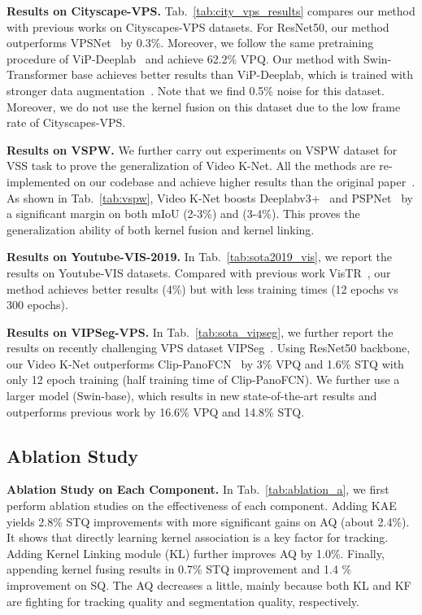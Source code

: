 \noindent
\textbf{Results on Cityscape-VPS.} Tab.~\ref{tab:city_vps_results} compares our method with previous works on Cityscapes-VPS datasets. For ResNet50, our method outperforms VPSNet~\cite{kim2020vps} by 0.3\%. Moreover, we follow the same pretraining procedure of ViP-Deeplab~\cite{ViPDeepLab} and achieve 62.2\% VPQ. Our method with Swin-Transformer base achieves better results than ViP-Deeplab, which is trained with stronger data augmentation~\cite{cubuk2018autoaugment}. Note that we find 0.5\% noise for this dataset. Moreover, we do not use the kernel fusion on this dataset due to the low frame rate of Cityscapes-VPS.

\noindent
\textbf{Results on VSPW.} We further carry out experiments on VSPW dataset for VSS task to prove the generalization of Video K-Net. All the methods are re-implemented on our codebase and achieve higher results than the original paper~\cite{miao2021vspw}. As shown in Tab.~\ref{tab:vspw}, Video K-Net boosts Deeplabv3+~\cite{deeplabv3plus} and PSPNet~\cite{zhao2017pyramid} by a significant margin on both mIoU (2-3\%) and  (3-4\%). This proves the generalization ability of both kernel fusion and kernel linking.

\noindent
\textbf{Results on Youtube-VIS-2019.} In Tab.~\ref{tab:sota2019_vis}, we report the results on Youtube-VIS datasets. Compared with previous work VisTR~\cite{VIS_TR}, our method achieves better results (4\%) but with less training times (12 epochs vs 300 epochs).

\noindent
\textbf{Results on VIPSeg-VPS.} In Tab.~\ref{tab:sota_vipseg}, we further report the results on recently challenging VPS dataset VIPSeg~\cite{miao2022large}. Using ResNet50 backbone, our Video K-Net outperforms Clip-PanoFCN~\cite{miao2022large} by 3\% VPQ and 1.6\% STQ with only 12 epoch training (half training time of Clip-PanoFCN). We further use a larger model (Swin-base), which results in new state-of-the-art results and outperforms previous work by 16.6\% VPQ and 14.8\% STQ. 


\subsection{Ablation Study}
\label{sec:ablation}

\noindent
\textbf{Ablation Study on Each Component.} In Tab.~\ref{tab:ablation_a}, we first perform ablation studies on the effectiveness of each component. Adding KAE yields 2.8\% STQ improvements with more significant gains on AQ (about 2.4\%). It shows that directly learning kernel association is a key factor for tracking. Adding Kernel Linking module (KL) further improves AQ by 1.0\%. Finally, appending kernel fusing results in 0.7\% STQ improvement and 1.4 \% improvement on SQ. The AQ decreases a little, mainly because both KL and KF are fighting for tracking quality and segmentation quality, respectively.

